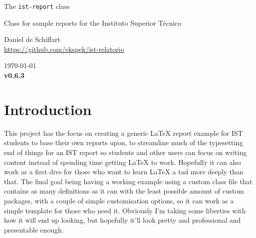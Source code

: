\documentclass[palatino,english]{ist-report}
\begin{document}
\institution{}
\title{}

\begin{center}
	\vspace*{1cm}
	{\huge The \texttt{ist-report} class}
	\medskip\par
	{\Large Class for sample reports for the Instituto Superior Técnico}
	\bigskip\bigskip\par
	{\large Daniel de Schiffart} \\
	{\url{https://github.com/ekspek/ist-relatorio}}
	\bigskip\smallskip\par
	\today \\
	\textbf{v0.6.3}
\end{center}
\vspace*{1cm}

\begin{abstract}
	The \LaTeX{} class developed in this project was developed as a template for reports developed for the Instituto Superior Técnico of Universidade de Lisboa, themed around the style the university has developed for its own internal documentation, complemented by using specifications defined by the university itself, all the while taking some creative liberties with the missing definitions.
	
	This document details the class file, what it exactly contains, what its options are, and a concise documentation of its development, which will grow as the class file progresses. The class file itself, \texttt{ist-report.cls}, should be in the same directory as the \texttt{doc.tex} file.
\end{abstract}

\tableofcontents

\section{Introduction}

This project has the focus on creating a generic \LaTeX{} report example for IST students to base their own reports upon, to streamline much of the typesetting end of things for an IST report so students and other users can focus on writing content instead of spending time getting \LaTeX{} to work. Hopefully it can also work as a first dive for those who want to learn \LaTeX{} a tad more deeply than that. The final goal being having a working example using a custom class file that contains as many definitions as it can with the least possible amount of custom packages, with a couple of simple customisation options, so it can work as a simple template for those who need it. Obviously I'm taking some liberties with how it will end up looking, but hopefully it'll look pretty and professional and presentable enough.
\end{document}
